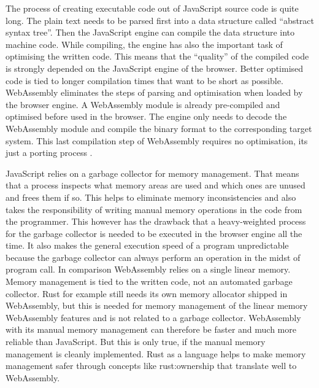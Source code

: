 The process of creating executable code out of JavaScript source code is quite long. The plain text needs to be parsed first into a data structure called ``abstract syntax tree''. Then the JavaScript engine can compile the data structure into machine code. While compiling, the engine has also the important task of optimising the written code. This means that the ``quality'' of the compiled code is strongly depended on the JavaScript engine of the browser. Better optimised code is tied to longer compilation times that want to be short as possible. WebAssembly eliminates the steps of parsing and optimisation when loaded by the browser engine. A WebAssembly module is already pre-compiled and optimised before used in the browser. The engine only needs to decode the WebAssembly module and compile the binary format to the corresponding target system. This last compilation step of WebAssembly requires no optimisation, its just a porting process \cite{wasm:howandwhy}. 

JavaScript relies on a garbage collector for memory management. That means that a process inspects what memory areas are used and which ones are unused and frees them if so. This helps to eliminate memory inconsistencies and also takes the responsibility of writing manual memory operations in the code from the programmer. This however has the drawback that a heavy-weighted process for the garbage collector is needed to be executed in the browser engine all the time. It also makes the general execution speed of a program unpredictable because the garbage collector can always perform an operation in the midst of program call. In comparison WebAssembly relies on a single linear memory. Memory management is tied to the written code, not an automated garbage collector. Rust for example still needs its own memory allocator shipped in WebAssembly, but this is needed for memory management of the linear memory WebAssembly features and is not related to a garbage collector. WebAssembly with its manual memory management can therefore be faster and much more reliable than JavaScript. But this is only true, if the manual memory management is cleanly implemented. Rust as a language helps to make memory management safer through concepts like \gls{rust:ownership} that translate well to WebAssembly. 


